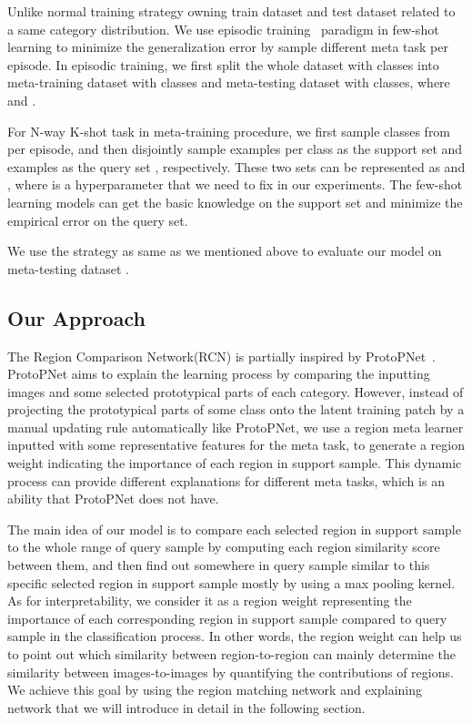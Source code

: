 \documentclass[letterpaper]{article}
\begin{document}
Unlike normal training strategy owning train dataset and test dataset related to a same category distribution. We use episodic training~\cite{VinyalsMatching} paradigm in few-shot learning to minimize the generalization error by sample different meta task per episode. In episodic training, we first split the whole dataset  with  classes into meta-training dataset  with  classes and meta-testing dataset  with  classes, where  and . 

For N-way K-shot task in meta-training procedure, we first sample  classes from  per episode, and then disjointly sample  examples per class as the support set  and  examples as the query set , respectively. These two sets can be represented as  and , where  is a hyperparameter that we need to fix in our experiments. The few-shot learning models can get the basic knowledge on the support set and minimize the empirical error on the query set. 

We use the strategy as same as we mentioned above to evaluate our model on meta-testing dataset . 

\subsection{Our Approach}\label{subsection: model}
The Region Comparison Network(RCN) is partially inspired by ProtoPNet~\cite{Chen2018ThisLL}. ProtoPNet aims to explain the learning process by comparing the inputting images and some selected prototypical parts of each category. However, instead of projecting the prototypical parts of some class onto the latent training patch by a manual updating rule automatically like ProtoPNet, we use a region meta learner inputted with some representative features for the meta task, to generate a region weight indicating the importance of each region in support sample. This dynamic process can provide different explanations for different meta tasks, which is an ability that ProtoPNet does not have.

The main idea of our model is to compare each selected region in support sample to the whole range of query sample by computing each region similarity score between them, and then find out somewhere in query sample similar to this specific selected region in support sample mostly by using a max pooling kernel. As for interpretability, we consider it as a region weight representing the importance of each corresponding region in support sample compared to query sample in the classification process. In other words, the region weight can help us to point out which similarity between region-to-region can mainly determine the similarity between images-to-images by quantifying the contributions of regions. We achieve this goal by using the region matching network and explaining network that we will introduce in detail in the following section.
\end{document}
